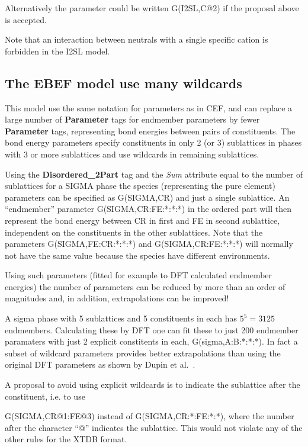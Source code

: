 \documentclass{article}
\begin{document}
Alternatively the parameter could be written G(I2SL,C@2) if the
proposal above is accepted.

Note that an interaction between neutrals with a single specific
cation is forbidden in the I2SL model.

\subsection{The EBEF model use many wildcards}\label{sec:ebef}

This model use the same notation for parameters as in CEF, and can
replace a large number of {\bf Parameter} tags for endmember
parameters by fewer {\bf Parameter} tags, representing bond energies
between pairs of constituents.  The bond energy parameters specify
constituents in only 2 (or 3) sublattices in phases with 3 or more
sublattices and use wildcards in remaining sublattices.

Using the {\bf Disordered\_2Part} tag and the {\em Sum} attribute
equal to the number of sublattices for a SIGMA phase the species
(representing the pure element) parameters can be specified as
G(SIGMA,CR) and just a single sublattice.  An ``endmember'' parameter
G(SIGMA,CR:FE:*:*:*) in the ordered part will then represent the bond
energy between CR in first and FE in second sublattice, independent on
the constituents in the other sublattices.  Note that the parameters
G(SIGMA,FE:CR:*:*:*) and G(SIGMA,CR:FE:*:*:*) will normally not have
the same value because the species have different environments.

Using such parameters (fitted for example to DFT calculated endmember
energies) the number of parameters can be reduced by more than an
order of magnitudes and, in addition, extrapolations can be improved!

A sigma phase with 5 sublattices and 5 constituents in each has $5^5 =
3125$ endmembers.  Calculating these by DFT one can fit these to just
200 endmember paramaters with just 2 explicit constitents in each,
G(sigma,A:B:*:*:*).  In fact a subset of wildcard parameters provides
better extrapolations than using the original DFT parameters as shown
by Dupin et al.~\cite{18Dup}.

A proposal to avoid using explicit wildcards is to indicate the
sublattice after the constituent, i.e. to use

G(SIGMA,CR@1:FE@3) instead of G(SIGMA,CR:*:FE:*:*), where the number
after the character ``@'' indicates the sublattice.  This would not
violate any of the other rules for the XTDB format.
\end{document}
